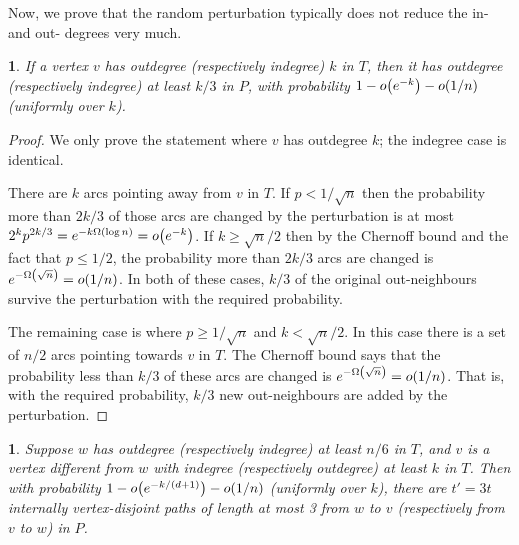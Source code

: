 \documentclass[11pt,english]{article}
\theoremstyle{plain}
\theoremstyle{definition}
\theoremstyle{definition}
\theoremstyle{plain}
\theoremstyle{plain}
\theoremstyle{plain}
\newtheorem{lem}[thm]{\protect\lemmaname}
\theoremstyle{plain}
\theoremstyle{remark}
\theoremstyle{remark}
\let\originalleft\left
\let\originalright\right
\renewcommand{\left}{\mathopen{}\mathclose\bgroup\originalleft}
\renewcommand{\right}{\aftergroup\egroup\originalright}
\providecommand{\lemmaname}{Lemma}
\begin{document}
Now, we prove that the random perturbation typically does not reduce
the in- and out- degrees very much. 
\begin{lem}
\label{lem:preserve-degree}If a vertex $v$ has outdegree (respectively
indegree) $k$ in $T$, then it has outdegree (respectively indegree)
at least $k/3$ in $P$, with probability $1-o\left(e^{-k}\right)-o\left(1/n\right)$
(uniformly over $k$).\end{lem}
\begin{proof}
We only prove the statement where $v$ has outdegree $k$; the indegree
case is identical.

There are $k$ arcs pointing away from $v$ in $T$. If $p<1/\sqrt{n}$ then the probability more than  $2k/3$ of those arcs are changed by the perturbation is at most $2^kp^{2k/3}=e^{-k\Omega\left(\log n\right)}=o\left(e^{-k}\right)$. If $k\ge\sqrt{n}/2$ then by the Chernoff bound and the fact that $p\le1/2$, the probability more than $2k/3$ arcs are changed is $e^{-\Omega\left(\sqrt{n}\right)}=o\left(1/n\right)$. In both of these cases, $k/3$ of the original out-neighbours survive
the perturbation with the required probability.

The remaining case is where $p\ge1/\sqrt{n}$ and $k<\sqrt{n}/2$.
In this case there is a set of $n/2$ arcs pointing towards $v$ in
$T$. The Chernoff bound says that the probability less than $k/3$
of these arcs are changed is $e^{-\Omega\left(\sqrt{n}\right)}=o\left(1/n\right)$.
That is, with the required probability, $k/3$ new out-neighbours
are added by the perturbation.\end{proof}
\begin{lem}
\label{lem:path-from-home}Suppose $w$ has outdegree (respectively
indegree) at least $n/6$ in $T$, and $v$ is a vertex different
from $w$ with indegree (respectively outdegree) at least $k$ in
$T$. Then with probability $1-o\left(e^{-k/\left(d+1\right)}\right)-o\left(1/n\right)$
(uniformly over $k$), there are $t'=3t$ internally vertex-disjoint
paths of length at most 3 from $w$ to $v$ (respectively from $v$
to $w$) in $P$.\end{lem}
\end{document}
